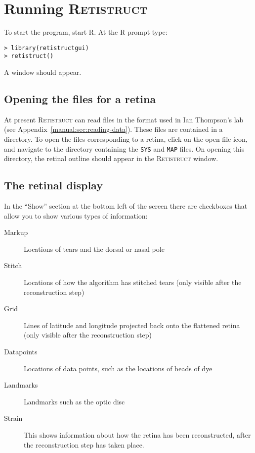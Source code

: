 \documentclass{article}
\begin{document}
\section{Running \textsc{Retistruct}}
\label{manual:sec:running}

To start the program, start \textsc{R}. At the \textsc{R} prompt type:

\begin{verbatim}
> library(retistructgui)
> retistruct()
\end{verbatim}
A window should appear.

\subsection{Opening the files for a retina}
\label{manual:sec:opening-files-retina}

At present \textsc{Retistruct} can read files in the format used in
Ian Thompson's lab (see Appendix~\ref{manual:sec:reading-data}). These
files are contained in a directory. To open the files corresponding to
a retina, click on the open file icon, and navigate to the directory
containing the \texttt{SYS} and \texttt{MAP} files. On opening this
directory, the retinal outline should appear in the
\textsc{Retistruct} window.

\subsection{The retinal display}
\label{manual:sec:retinal-display}

In the ``Show'' section at the bottom left of the screen there are
checkboxes that allow you to show various types of information:
\begin{description}
\item[Markup] Locations of tears and the dorsal or nasal pole
\item[Stitch] Locations of how the algorithm has stitched tears (only
  visible after the reconstruction step)
\item[Grid] Lines of latitude and longitude projected back onto the
  flattened retina (only visible after the reconstruction step)
\item[Datapoints] Locations of data points, such as the locations of
  beads of dye
\item[Landmarks] Landmarks such as the optic disc
\item[Strain] This shows information about how the retina has been
  reconstructed, after the reconstruction step has taken place.
\end{description}
\end{document}
